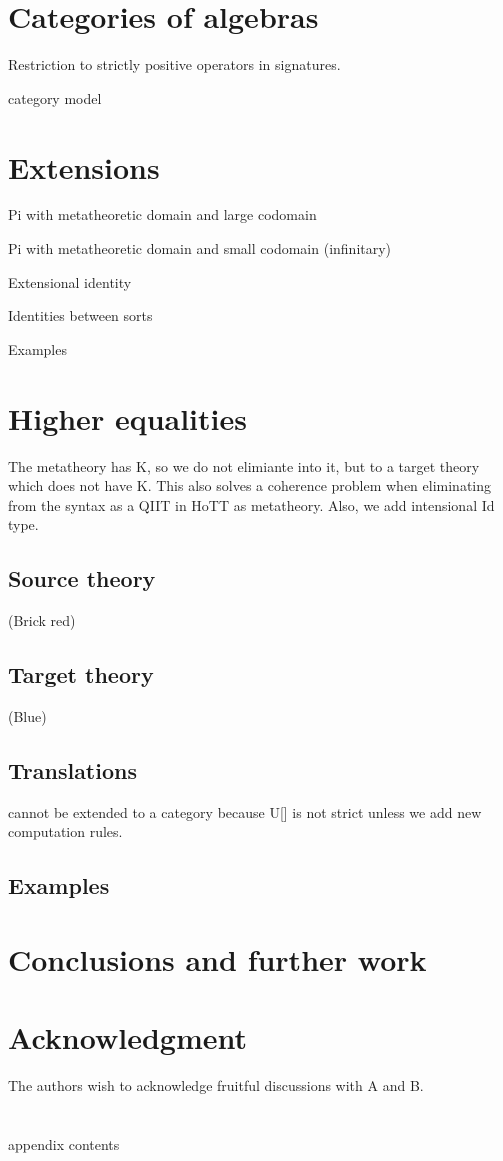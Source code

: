 \documentclass{lmcs} %
\theoremstyle{plain}\newtheorem{satz}[thm]{Satz} %
\begin{document}
\section*{Categories of algebras}

Restriction to strictly positive operators in signatures.

category model

\section*{Extensions}

Pi with metatheoretic domain and large codomain

Pi with metatheoretic domain and small codomain (infinitary)

Extensional identity

Identities between sorts

Examples

\section*{Higher equalities}

The metatheory has K, so we do not elimiante into it, but to a target
theory which does not have K. This also solves a coherence problem
when eliminating from the syntax as a QIIT in HoTT as
metatheory. Also, we add intensional Id type.

\subsection*{Source theory}

(Brick red)

\subsection*{Target theory}

(Blue)

\subsection*{Translations}

cannot be extended to a category because U[] is not strict unless we
add new computation rules.

\subsection*{Examples}

\section*{Conclusions and further work}

\section*{Acknowledgment}
  \noindent The authors wish to acknowledge fruitful discussions with
  A and B.




  
\appendix
\section{}

appendix contents
\end{document}
